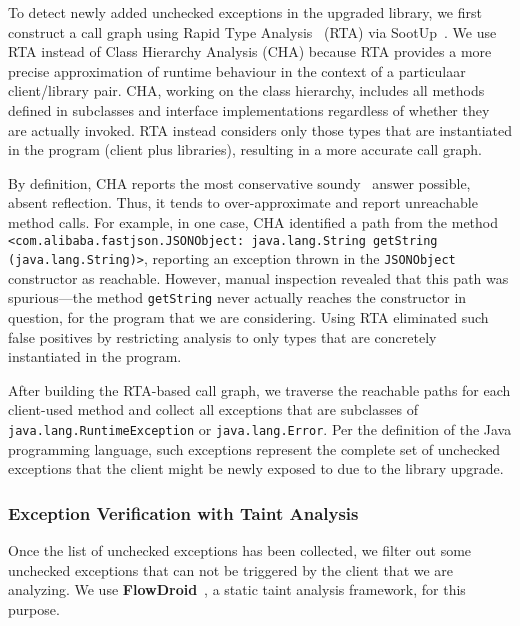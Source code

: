 To detect newly added unchecked exceptions in the upgraded library, we first construct a call graph using Rapid Type Analysis~\cite{bacon96:_fast_static_analy_c_virtual_funct_calls} (RTA) via SootUp~\cite{Karakaya24:_sootup}. We use RTA instead of Class Hierarchy Analysis (CHA) because RTA provides a more precise approximation of runtime behaviour in the context of a particulaar client/library pair. CHA, working on the class hierarchy, includes all methods defined in subclasses and interface implementations regardless of whether they are actually invoked. RTA instead considers only those types that are instantiated in the program (client plus libraries), resulting in a more accurate call graph.

By definition, CHA reports the most conservative soundy~\cite{livshits15:_in} answer possible, absent reflection. Thus, it tends to over-approximate and report unreachable method calls. For example, in one case, CHA identified a path from the method \texttt{<com.alibaba.fastjson.JSONObject: java.lang.String getString (java.lang.String)>}, reporting an exception thrown in the \texttt{JSONObject} constructor as reachable. However, manual inspection revealed that this path was spurious—the method \texttt{getString} never actually reaches the constructor in question, for the program that we are considering. Using RTA eliminated such false positives by restricting analysis to only types that are concretely instantiated in the program.

After building the RTA-based call graph, we traverse the reachable paths for each client-used method and collect all exceptions that are subclasses of \texttt{java.lang.RuntimeException} or \texttt{java.lang.Error}. Per the definition of the Java programming language, such exceptions represent the complete set of unchecked exceptions that the client might be newly exposed to due to the library upgrade.

\subsubsection{Exception Verification with Taint Analysis}

Once the list of unchecked exceptions has been collected, we filter out some unchecked exceptions that can not be triggered by the client that we are analyzing. We use \textbf{FlowDroid}~\cite{Arzt14:_flowdroid}, a static taint analysis framework, for this purpose.

